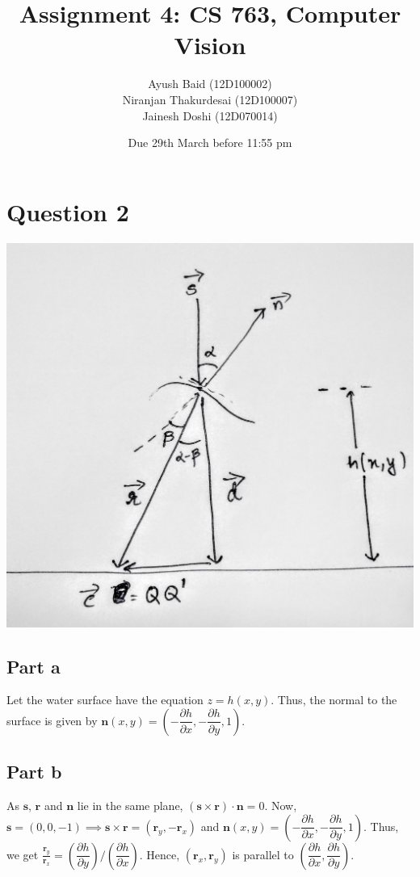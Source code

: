 \documentclass[11pt]{article}
\title{Assignment 4: CS 763, Computer Vision}
\author{Ayush Baid (12D100002) \\
Niranjan Thakurdesai (12D100007) \\
Jainesh Doshi (12D070014)}
\date{Due 29th March before 11:55 pm}
\begin{document}
\maketitle

\section*{Question 2}

\includegraphics[scale=0.2]{diagram.jpg}

\subsection*{Part a}
Let the water surface have the equation $z = h(x,y)$. Thus, the normal to the surface is given by $\mathbf{n}(x,y) = \left( -\dfrac{\partial h}{\partial x},-\dfrac{\partial h}{\partial y},1 \right)$.\\

\subsection*{Part b}
As $\mathbf{s}$, $\mathbf{r}$ and $\mathbf{n}$ lie in the same plane, $(\mathbf{s}\times\mathbf{r})\cdot\mathbf{n}=0$. Now, $\mathbf{s} = (0,0,-1) \implies \mathbf{s}\times\mathbf{r} = (\mathbf{r}_y,-\mathbf{r}_x)$ and $\mathbf{n}(x,y) = \left( -\dfrac{\partial h}{\partial x},-\dfrac{\partial h}{\partial y},1 \right)$. Thus, we get $\frac{\mathbf{r}_y}{\mathbf{r}_x} = \left(\dfrac{\partial h}{\partial y}\right)/\left(\dfrac{\partial h}{\partial x}\right)$. Hence, $(\mathbf{r}_x,\mathbf{r}_y)$ is parallel to $(\dfrac{\partial h}{\partial x},\dfrac{\partial h}{\partial y})$.
\end{document}
